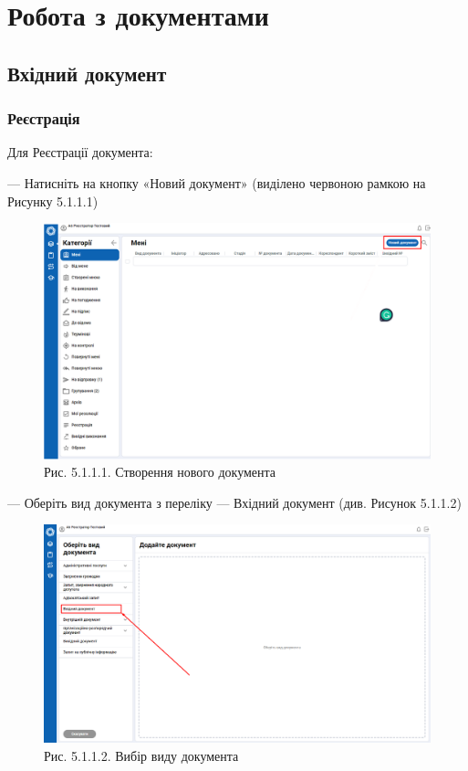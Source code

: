 \chapter{Робота з документами}

\section{Вхідний документ}

\subsection{Реєстрація}

Для Реєстрації документа:

--- Натисніть на кнопку «Новий документ» (виділено червоною рамкою на Рисунку 5.1.1.1)

\begin{figure}[!htbp]
\centerline{\includegraphics[width=\textwidth]{img/5.1.1.1.png}}
\caption{Рис. 5.1.1.1. Створення нового документа}
\end{figure}

--- Оберіть вид документа з переліку --- Вхідний документ (див. Рисунок 5.1.1.2)

\begin{figure}[!htbp]
\centerline{\includegraphics[width=\textwidth]{img/5.1.1.2.png}}
\caption{Рис. 5.1.1.2. Вибір виду документа}
\end{figure}

